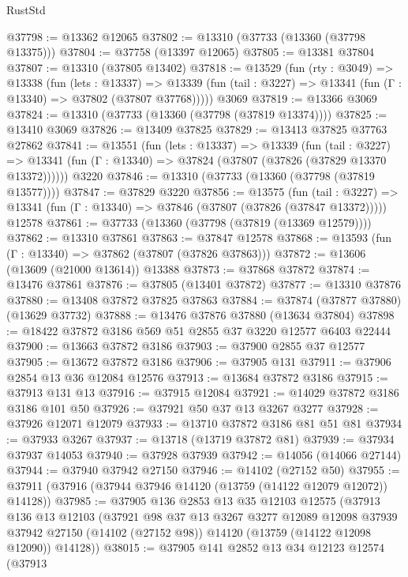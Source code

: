\begin{lexlean}{RustStd}
\begin{coremodule}
@37798 := @13362 @12065
@37802 := @13310 (@37733 (@13360 (@37798 @13375)))
@37804 := @37758 (@13397 @12065)
@37805 := @13381 @37804
@37807 := @13310 (@37805 @13402)
@37818 := @13529
    (fun (rty : @3049) =>
    @13338
      (fun (lets : @13337) =>
      @13339 (fun (tail : @3227) => @13341 (fun (Γ : @13340) => @37802 (@37807 @37768)))))
    @3069
@37819 := @13366 @3069
@37824 := @13310 (@37733 (@13360 (@37798 (@37819 @13374))))
@37825 := @13410 @3069
@37826 := @13409 @37825
@37829 := @13413 @37825 @37763 @27862
@37841 := @13551
    (fun (lets : @13337) =>
    @13339
      (fun (tail : @3227) =>
      @13341 (fun (Γ : @13340) => @37824 (@37807 (@37826 (@37829 @13370 @13372))))))
    @3220
@37846 := @13310 (@37733 (@13360 (@37798 (@37819 @13577))))
@37847 := @37829 @3220
@37856 := @13575
    (fun (tail : @3227) => @13341 (fun (Γ : @13340) => @37846 (@37807 (@37826 (@37847 @13372)))))
    @12578
@37861 := @37733 (@13360 (@37798 (@37819 (@13369 @12579))))
@37862 := @13310 @37861
@37863 := @37847 @12578
@37868 := @13593 (fun (Γ : @13340) => @37862 (@37807 (@37826 @37863)))
@37872 := @13606 (@13609 (@21000 @13614)) @13388
@37873 := @37868 @37872
@37874 := @13476 @37861
@37876 := @37805 (@13401 @37872)
@37877 := @13310 @37876
@37880 := @13408 @37872 @37825 @37863
@37884 := @37874 (@37877 @37880) (@13629 @37732)
@37888 := @13476 @37876 @37880 (@13634 @37804)
@37898 := @18422 @37872 @3186 @569 @51 @2855 @37 @3220 @12577 @6403 @22444
@37900 := @13663 @37872 @3186
@37903 := @37900 @2855 @37 @12577
@37905 := @13672 @37872 @3186
@37906 := @37905 @131
@37911 := @37906 @2854 @13 @36 @12084 @12576
@37913 := @13684 @37872 @3186
@37915 := @37913 @131 @13
@37916 := @37915 @12084
@37921 := @14029 @37872 @3186 @3186 @101 @50
@37926 := @37921 @50 @37 @13 @3267 @3277
@37928 := @37926 @12071 @12079
@37933 := @13710 @37872 @3186 @81 @51 @81
@37934 := @37933 @3267
@37937 := @13718 (@13719 @37872 @81)
@37939 := @37934 @37937 @14053
@37940 := @37928 @37939
@37942 := @14056 (@14066 @27144)
@37944 := @37940 @37942 @27150
@37946 := @14102 (@27152 @50)
@37955 := @37911 (@37916 (@37944 @37946 @14120 (@13759 (@14122 @12079 @12072)) @14128))
@37985 := @37905
    @136
    @2853
    @13
    @35
    @12103
    @12575
    (@37913
      @136
      @13
      @12103
      (@37921
        @98
        @37
        @13
        @3267
        @3277
        @12089
        @12098
        @37939
        @37942
        @27150
        (@14102 (@27152 @98))
        @14120
        (@13759 (@14122 @12098 @12090))
        @14128))
@38015 := @37905
    @141
    @2852
    @13
    @34
    @12123
    @12574
    (@37913

\end{coremodule}
\end{lexlean}
